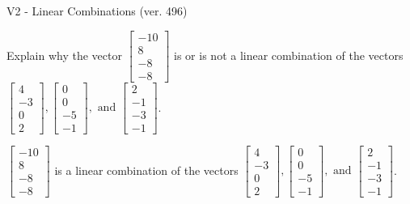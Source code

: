 \begin{exercise}
  \begin{exerciseTitle}V2 - Linear Combinations (ver. 496)\end{exerciseTitle}
  \begin{exerciseStatement}
    Explain why the vector \(\left[\begin{array}{c}
-10 \\
8 \\
-8 \\
-8
\end{array}\right]\)  is or is not a linear 
	combination of the vectors \(\left[\begin{array}{c}
4 \\
-3 \\
0 \\
2
\end{array}\right] , \left[\begin{array}{c}
0 \\
0 \\
-5 \\
-1
\end{array}\right] , \text{ and } \left[\begin{array}{c}
2 \\
-1 \\
-3 \\
-1
\end{array}\right]\).
	


  \end{exerciseStatement}
  \begin{exerciseAnswer}
   \(\left[\begin{array}{c}
-10 \\
8 \\
-8 \\
-8
\end{array}\right]\) 
  	 is  
	a linear combination of the vectors \(\left[\begin{array}{c}
4 \\
-3 \\
0 \\
2
\end{array}\right] , \left[\begin{array}{c}
0 \\
0 \\
-5 \\
-1
\end{array}\right] , \text{ and } \left[\begin{array}{c}
2 \\
-1 \\
-3 \\
-1
\end{array}\right]\).

	
  


  \end{exerciseAnswer}
\end{exercise}